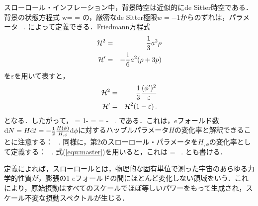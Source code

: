 スローロール・インフレーション中，背景時空は近似的にde Sitter時空である．背景の状態方程式
\beq
w= = 
\eeq
の，厳密なde Sitter極限$w=-1$からのずれは，パラメータ
\beq
{}\, .
\eeq
によって定義できる．Friedmann方程式
\begin{eqnarray}
{\cal H}^2 &=& \frac{1}{3} a^2 \rho\\
{\cal H}' &=& -\frac{1}{6} a^2 (\rho+3p)
\end{eqnarray}
を$\varepsilon$を用いて表すと，
\begin{eqnarray}
{\cal H}^2 &=& \frac{1}{3} \frac{(\phi')^2}{\varepsilon}\\
{\cal H}' &=& {\cal H}^2 (1-\varepsilon) \, .
\end{eqnarray}
となる．したがって，
\beq
\varepsilon = 1- =  = - \, .
\eeq
である．これは，$e$フォールド数${\rm d} N = H {\rm d} t = -\frac{1}{2} \frac{H(\phi)}{H_{,\phi}} {\rm d}\phi$に対するハッブルパラメータ$H$の変化率と解釈できることに注意する：
\beq
{}\, .
\eeq
同様に，第2のスローロール・パラメータを$H_{,\phi}$の変化率として定義する：
\beq
{}\, .
\eeq
式(\ref{equ:master})を用いると，これは
\beq
\eta = \, .
\eeq
とも書ける．






定義によれば，スローロールとは，物理的な固有単位で測った宇宙のあらゆる力学的性質が，膨張の1 $e$フォールドの間にほとんど変化しない領域をいう．これにより，原始摂動はすべてのスケールでほぼ等しいパワーをもって生成され，スケール不変な摂動スペクトルが生じる．



